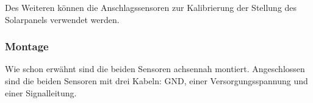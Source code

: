 Des Weiteren können die Anschlagssensoren zur Kalibrierung der Stellung des Solarpanels verwendet werden.

\subsubsection{Montage}
Wie schon erwähnt sind die beiden Sensoren achsennah montiert. Angeschlossen sind die beiden Sensoren mit drei Kabeln: GND, einer Versorgungsspannung und einer Signalleitung.

